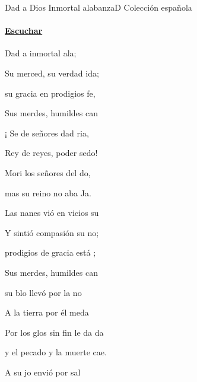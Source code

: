 \documentclass[12pt, spanish]{book}
\newcommand{\NotCCLIed}{\relax}
\begin{document}
    \begin{song}{Dad a Dios Inmortal alabanza}{D}
    {} %
    {Colección española}
    {} %
    {} %
        \ifChordBk
        \paragraph{\mbox{}\hfill\protect\href{https://open.spotify.com/intl-es/track/4LeTETSxqGtSsnZ0mlSJeE}{Escuchar}\mbox{}\hfill}
        \fi

        \begin{SBOpGroup}
            Dad a  inmortal ala;

            Su merced, su verdad  ida;

             su gracia en prodigios fe,

            Sus merdes, humildes can

            ¡ Se de señores dad ria,

            Rey de reyes, poder  sedo!

            Mori los señores del do,

            mas su reino no aba Ja.
        \end{SBOpGroup}
        \vskip 20pt
        \begin{SBOpGroup}
            Las nanes vió en vicios su

            Y sintió compasión  su no;

             prodigios de gracia está ;

            Sus merdes, humildes can

             su blo llevó por la no

            A la tierra por él meda

            Por los glos sin fin le da da

            y el pecado y la muerte cae.
        \end{SBOpGroup}
        \vskip 20pt
        \begin{SBOpGroup}
            A su jo envió por sal


\end{SBOpGroup}
\end{song}
\end{document}
